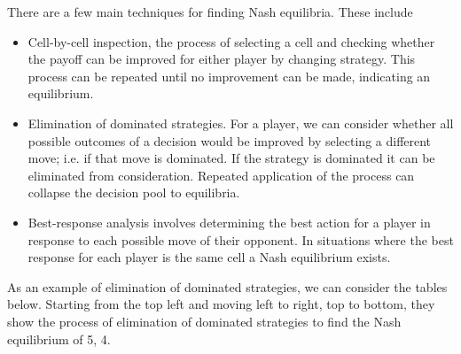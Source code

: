 \documentclass[12pt]{report}
\begin{document}
\begin{flushleft}
\bigskip
There are a few main techniques for finding Nash equilibria. These include
\begin{itemize}
    \item Cell-by-cell inspection, the process of selecting a cell and checking
    whether the payoff can be improved for either player by changing strategy.
    This process can be repeated until no improvement can be made, indicating 
    an equilibrium.
    \item Elimination of dominated strategies. For a player, we can consider 
    whether all possible outcomes of a decision would be improved by selecting
    a different move; i.e. if that move is dominated. If the strategy is 
    dominated it can be eliminated from consideration. Repeated application of
    the process can collapse the decision pool to equilibria.
    \item Best-response analysis involves determining the best action for a 
    player in response to each possible move of their opponent. In situations
    where the best response for each player is the same cell a Nash equilibrium
    exists.
\end{itemize}

\pagebreak
As an example of elimination of dominated strategies, we can consider the 
tables below. Starting from the top left and moving left to right, top to
bottom, they show the process of elimination of dominated strategies to find
the Nash equilibrium of 5, 4.


\end{flushleft}
\end{document}
